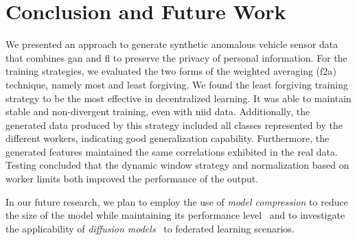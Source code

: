 \section{Conclusion and Future Work}


We presented an approach to generate synthetic anomalous vehicle sensor data that combines \gls*{gan} and \gls*{fl} to preserve the privacy of personal information. For the training strategies, %
%
we evaluated the two forms of the weighted averaging (\gls*{f2a}) technique, namely most and least forgiving. %
%
We found the least forgiving training strategy to be the most effective in decentralized learning. It was able to maintain stable and non-divergent training, even with \gls*{niid} data. Additionally, the generated data produced by this strategy included all classes represented by the different workers, indicating good generalization capability. Furthermore, the generated features maintained the same correlations exhibited in the real data.
%
Testing concluded that the dynamic window strategy and normalization based on worker limits both improved the performance of the output. 


In our future research, we plan to employ the use of \textit{model compression} to reduce the size of the model while maintaining its performance level~\cite{hinton2015distilling} and to investigate the applicability of \textit{diffusion models}~\cite{alcaraz_diffusion-based_2022} to federated learning scenarios.

